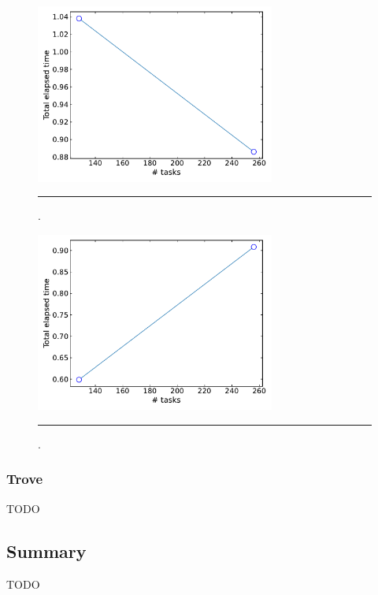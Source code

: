 \documentclass[10pt]{article}
\begin{document}
\begin{figure}[h!]
	\centering
	\includegraphics[width=0.7\textwidth]{Sphng_strong.pdf}
	\vspace{0.1cm}
	\hrule
	\vspace{0.1cm}
	\caption{.}
	\label{fig::sphng_ss}
\end{figure}


\begin{figure}[h!]
	\centering
	\includegraphics[width=0.7\textwidth]{Sphng_weak.pdf}
	\vspace{0.1cm}
	\hrule
	\vspace{0.1cm}
	\caption{.}
	\label{fig::sphng_ws}
\end{figure}


\clearpage
\subsubsection{Trove}
TODO


\clearpage
\subsection{Summary}

TODO
\end{document}
